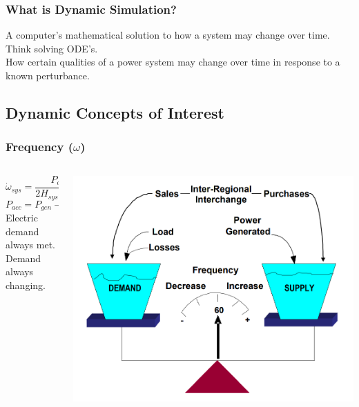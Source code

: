 \documentclass[14pt, unknownkeysallowed]{beamer}
\begin{document}
\begin{frame}
\frametitle{What is Dynamic Simulation?}
A computer's mathematical solution to how a system may change over time.\\%
\vspace{1em}
Think solving ODE's.\\
\vspace{1em}
How certain qualities of a power system may change over time in response to a known perturbance.
\end{frame}
\subsection{Dynamic Concepts of Interest}
\begin{frame}
\frametitle{Frequency ($\omega$)}
\begin{columns}
\begin{column}{0.4\textwidth}
\[ \dot{\omega}_{sys} = \dfrac{P_{acc, sys}}{2H_{sys}\omega_{sys}(t) } \]
\[ P_{acc} = P_{gen} - P_{load} \]
Electric demand always met.\\
\vspace{1em}
Demand always changing.
\end{column}
\begin{column}{0.7\textwidth}
    \begin{center}
     \includegraphics[width=\linewidth]{freqScale} %
     \end{center}
\end{column}
\end{columns}
\end{frame}
\end{document}
